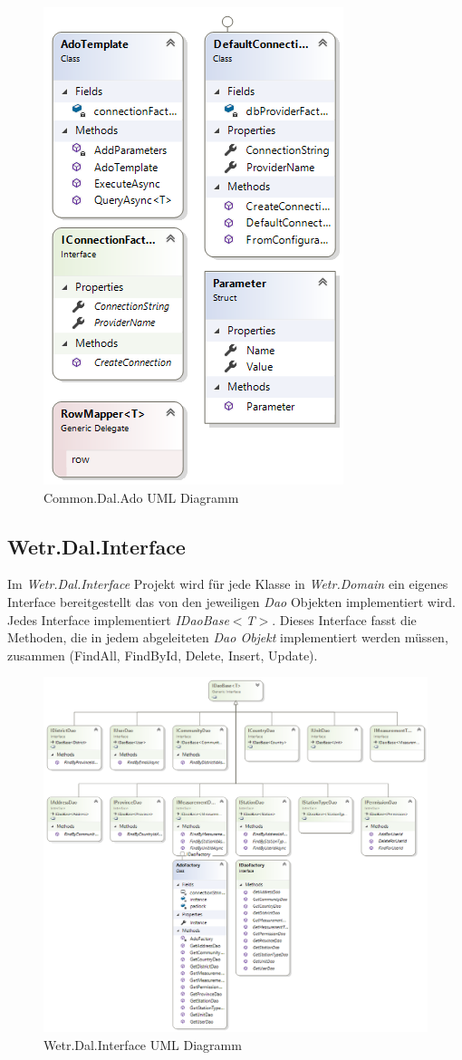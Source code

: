 \begin{figure}[H]
\centering
\includegraphics[width=.45\textwidth]{pictures/Common_Dal_Ado_ClassDiagramm.png}
\caption{Common.Dal.Ado UML Diagramm}
\label{fig:common.dal.ado}
\end{figure}
\raggedright

\newpage
\subsection{Wetr.Dal.Interface}
Im \textit{Wetr.Dal.Interface} Projekt wird für jede Klasse in  \textit{Wetr.Domain} ein eigenes Interface bereitgestellt das von den jeweiligen \textit{Dao} Objekten implementiert wird. Jedes Interface implementiert \textit{IDaoBase}$<$\textit{T}$>$. Dieses Interface fasst die Methoden, die in jedem abgeleiteten \textit{Dao Objekt} implementiert werden müssen, zusammen (FindAll, FindById, Delete, Insert, Update).

\begin{figure}[H]
\centering
\includegraphics[width=.8\textwidth]{pictures/Wetr_Dal_Interface.png}
\caption{Wetr.Dal.Interface UML Diagramm}
\label{fig:Wetr.Dal.Interface}
\end{figure}
\raggedright

